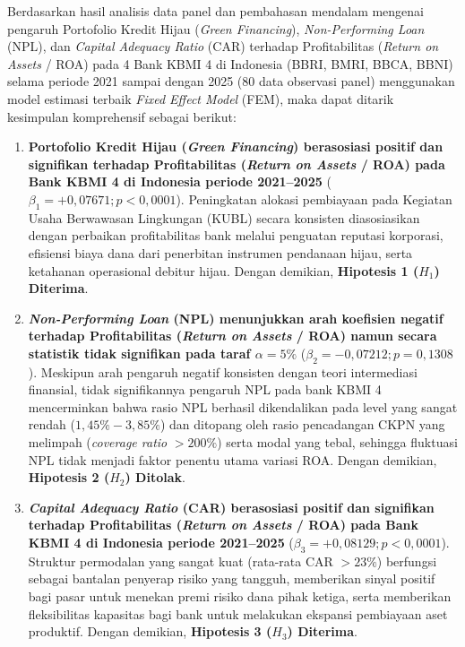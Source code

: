 \documentclass[12pt,a4paper]{article}
\numberwithin{equation}{section}
\begin{document}
\noindent
Berdasarkan hasil analisis data panel dan pembahasan mendalam mengenai pengaruh Portofolio Kredit Hijau (\emph{Green Financing}), \emph{Non-Performing Loan} (NPL), dan \emph{Capital Adequacy Ratio} (CAR) terhadap Profitabilitas (\emph{Return on Assets} / ROA) pada 4 Bank KBMI 4 di Indonesia (BBRI, BMRI, BBCA, BBNI) selama periode 2021 sampai dengan 2025 (80 data observasi panel) menggunakan model estimasi terbaik \emph{Fixed Effect Model} (FEM), maka dapat ditarik kesimpulan komprehensif sebagai berikut:

\begin{enumerate}
  \item \textbf{Portofolio Kredit Hijau (\emph{Green Financing}) berasosiasi positif dan signifikan terhadap Profitabilitas (\emph{Return on Assets} / ROA) pada Bank KBMI 4 di Indonesia periode 2021--2025} ($\beta_1 = +0{,}07671; p < 0{,}0001$). Peningkatan alokasi pembiayaan pada Kegiatan Usaha Berwawasan Lingkungan (KUBL) secara konsisten diasosiasikan dengan perbaikan profitabilitas bank melalui penguatan reputasi korporasi, efisiensi biaya dana dari penerbitan instrumen pendanaan hijau, serta ketahanan operasional debitur hijau. Dengan demikian, \textbf{Hipotesis 1 ($H_1$) Diterima}.

  \item \textbf{\emph{Non-Performing Loan} (NPL) menunjukkan arah koefisien negatif terhadap Profitabilitas (\emph{Return on Assets} / ROA) namun secara statistik tidak signifikan pada taraf $\alpha = 5\%$} ($\beta_2 = -0{,}07212; p = 0{,}1308$). Meskipun arah pengaruh negatif konsisten dengan teori intermediasi finansial, tidak signifikannya pengaruh NPL pada bank KBMI 4 mencerminkan bahwa rasio NPL berhasil dikendalikan pada level yang sangat rendah ($1{,}45\% - 3{,}85\%$) dan ditopang oleh rasio pencadangan CKPN yang melimpah (\emph{coverage ratio} $> 200\%$) serta modal yang tebal, sehingga fluktuasi NPL tidak menjadi faktor penentu utama variasi ROA. Dengan demikian, \textbf{Hipotesis 2 ($H_2$) Ditolak}.

  \item \textbf{\emph{Capital Adequacy Ratio} (CAR) berasosiasi positif dan signifikan terhadap Profitabilitas (\emph{Return on Assets} / ROA) pada Bank KBMI 4 di Indonesia periode 2021--2025} ($\beta_3 = +0{,}08129; p < 0{,}0001$). Struktur permodalan yang sangat kuat (rata-rata CAR $> 23\%$) berfungsi sebagai bantalan penyerap risiko yang tangguh, memberikan sinyal positif bagi pasar untuk menekan premi risiko dana pihak ketiga, serta memberikan fleksibilitas kapasitas bagi bank untuk melakukan ekspansi pembiayaan aset produktif. Dengan demikian, \textbf{Hipotesis 3 ($H_3$) Diterima}.


\end{enumerate}
\end{document}
